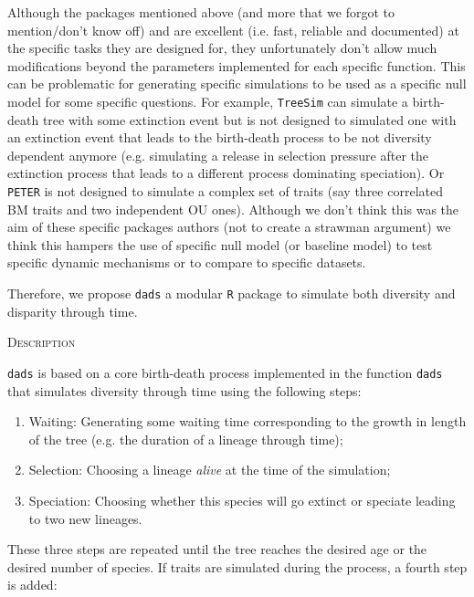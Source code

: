 \documentclass[12pt,letterpaper]{article}
\renewcommand{\section}[1]{%
\bigskip
\begin{center}
\begin{Large}
\normalfont\scshape #1
\medskip
\end{Large}
\end{center}}
\newcommand{\dads}{\texttt{dads} }
\begin{document}
Although the packages mentioned above (and more that we forgot to mention/don't know off) and are excellent (i.e. fast, reliable and documented) at the specific tasks they are designed for, they unfortunately don't allow much modifications beyond the parameters implemented for each specific function.
This can be problematic for generating specific simulations to be used as a specific null model for some specific questions.
For example, \texttt{TreeSim} can simulate a birth-death tree with some extinction event but is not designed to simulated one with an extinction event that leads to the birth-death process to be not diversity dependent anymore (e.g. simulating a release in selection pressure after the extinction process that leads to a different process dominating speciation).
Or \texttt{PETER} is not designed to simulate a complex set of traits (say three correlated BM traits and two independent OU ones).
Although we don't think this was the aim of these specific packages authors (not to create a strawman argument) we think this hampers the use of specific null model (or baseline model) to test specific dynamic mechanisms or to compare to specific datasets. 

Therefore, we propose \dads a modular \texttt{R} package to simulate both diversity and disparity through time.

\section{Description}
\dads is based on a core birth-death process implemented in the function \texttt{dads} that simulates diversity through time using the following steps:

\begin{enumerate}
    \item Waiting: Generating some waiting time corresponding to the growth in length of the tree (e.g. the duration of a lineage through time);
    \item Selection: Choosing a lineage \textit{alive} at the time of the simulation;
    \item Speciation: Choosing whether this species will go extinct or speciate leading to two new lineages.
\end{enumerate}

These three steps are repeated until the tree reaches the desired age or the desired number of species.
If traits are simulated during the process, a fourth step is added:
\end{document}
